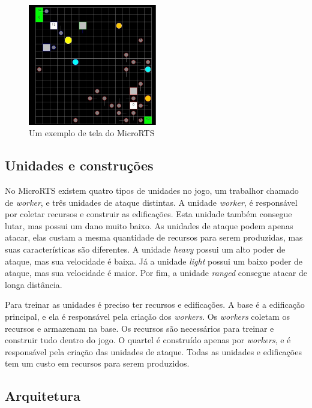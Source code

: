 \begin{figure}[ht]
	\centering
	\includegraphics[width=0.5\textwidth]{fig/microrts.pdf}
	\caption{Um exemplo de tela do MicroRTS}
	\label{fig:microrts}
\end{figure} 

\subsection{Unidades e construções}

No MicroRTS existem quatro tipos de unidades no jogo, um trabalhor chamado de \textit{worker}, e três unidades de ataque distintas.
A unidade \textit{worker}, é responsável por coletar recursos e construir as edificações. 
Esta unidade também consegue lutar, mas possui um dano muito baixo.
As unidades de ataque podem apenas atacar, elas custam a mesma quantidade de recursos para serem produzidas, mas suas características são diferentes. 
A unidade \textit{heavy} possui um alto poder de ataque, mas sua velocidade é baixa.
Já a unidade \textit{light} possui um baixo poder de ataque, mas sua velocidade é maior.
Por fim, a unidade \textit{ranged} consegue atacar de longa distância. 

Para treinar as unidades é preciso ter recursos e edificações. 
A base é a edificação principal, e ela é responsável pela criação dos \textit{workers}.
Os \textit{workers} coletam os recursos e armazenam na base.
Os recursos são necessários para treinar e construir tudo dentro do jogo. 
O quartel é construído apenas por \textit{workers}, e é responsável pela criação das unidades de ataque. 
Todas as unidades e edificações tem um custo em recursos para serem produzidos.

\subsection{Arquitetura}

